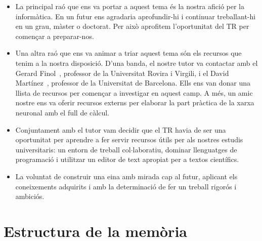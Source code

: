 \begin{itemize}
\item La principal raó que ens va portar a aquest tema és la nostra afició per la informàtica. En un futur ens agradaria aprofundir-hi i continuar treballant-hi en un grau, màster o doctorat. Per això aprofitem l’oportunitat del TR per començar a preparar-nos.

\item Una altra raó que ens va animar a triar aquest tema són els recursos que tenim a la nostra disposició. D'una banda, el nostre tutor va contactar amb el Gerard Finol~\cite{gerard}, professor de la Universitat Rovira i Virgili, i el David Martínez~\cite{david}, professor de la Universitat de Barcelona. Ells ens van donar una llista de recursos per començar a investigar en aquest camp. A més, un amic nostre ens va oferir recursos externs per elaborar la part pràctica de la xarxa neuronal amb el full de càlcul.

\item Conjuntament amb el tutor vam decidir que el TR havia de ser una oportunitat per aprendre a fer servir recursos útils per als nostres estudis universitaris: un entorn de treball col$\cdot$laboratiu, dominar llenguatges de programació i utilitzar un editor de text apropiat per a textos científics.

\item La voluntat de construir una eina amb mirada cap al futur, aplicant els coneixements adquirits i amb la determinació de fer un treball rigorós i ambiciós.
\end{itemize}

\section{Estructura de la memòria}

